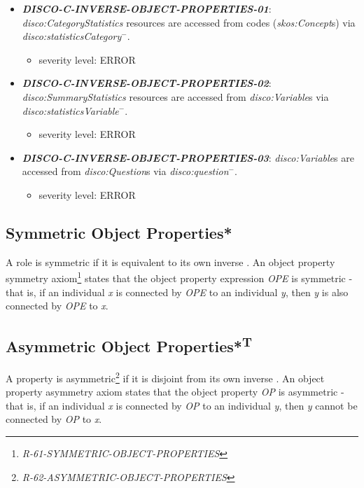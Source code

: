 \documentclass{llncs}
\begin{document}
\begin{itemize}
	\item \textbf{{\em DISCO-C-INVERSE-OBJECT-PROPERTIES-01}}:
	\emph{disco:CategoryStatistics} resources are accessed from codes (\emph{skos:Concept}s) via \emph{disco:statisticsCategory}$^{-}$.
	\begin{itemize}
		\item severity level: ERROR
	\end{itemize}
	\item \textbf{{\em DISCO-C-INVERSE-OBJECT-PROPERTIES-02}}:
	\emph{disco:SummaryStatistics} resources are accessed from \emph{disco:Variable}s via \emph{disco:statisticsVariable}$^{-}$.
	\begin{itemize}
		\item severity level: ERROR
	\end{itemize}
	\item \textbf{{\em DISCO-C-INVERSE-OBJECT-PROPERTIES-03}}:
	\emph{disco:Variable}s are accessed from \emph{disco:Question}s via \emph{disco:question}$^{-}$.
	\begin{itemize}
		\item severity level: ERROR
	\end{itemize}
\end{itemize}

\subsection{Symmetric Object Properties*}

A role is symmetric if it is equivalent to its own inverse \cite{Kroetzsch2012}.
An object property symmetry axiom\footnote{\emph{R-61-SYMMETRIC-OBJECT-PROPERTIES}} states that the object property expression \emph{OPE} is symmetric - that is, if an individual \emph{x} is connected by \emph{OPE} to an individual \emph{y}, then \emph{y} is also connected by \emph{OPE} to \emph{x}. 	

\subsection{Asymmetric Object Properties*\textsuperscript{T}}

A property is asymmetric\footnote{{\em R-62-ASYMMETRIC-OBJECT-PROPERTIES}} if it is disjoint from its own inverse \cite{Kroetzsch2012}.
An object property asymmetry axiom states that the object property \emph{OP} is asymmetric - that is, if an individual \emph{x} is connected by \emph{OP} to an individual \emph{y}, then \emph{y} cannot be connected by \emph{OP} to \emph{x}. 
\end{document}
